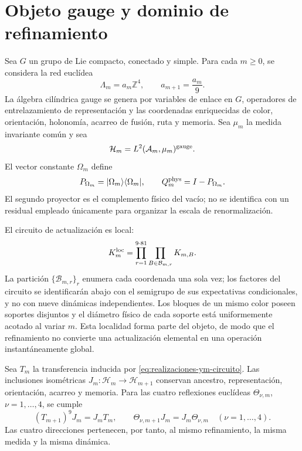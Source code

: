 \section*{Objeto gauge y dominio de refinamiento}

Sea \(G\) un grupo de Lie compacto, conectado y simple. Para cada
\(m\geq0\), se considera la red euclídea
\begin{equation}\label{eq:realizaciones-ym-red}
 \Lambda_m=a_m\mathbb Z^4,
 \qquad a_{m+1}=\frac{a_m}{9}.
\end{equation}
La álgebra cilíndrica gauge se genera por variables de enlace en \(G\),
operadores de entrelazamiento de representación y las coordenadas
enriquecidas de color,
orientación, holonomía, acarreo de fusión, ruta y memoria. Sea \(\mu_m\) la
medida invariante común y sea
\[
 \mathcal H_m=L^2(\mathcal A_m,\mu_m)^{\rm gauge}.
\]
El vector constante \(\Omega_m\) define
\begin{equation}\label{eq:realizaciones-ym-proyectores}
 P_{\Omega_m}=|\Omega_m\rangle\langle\Omega_m|,
 \qquad Q_m^{\rm phys}=I-P_{\Omega_m}.
\end{equation}
El segundo proyector es el complemento físico del vacío; no se identifica
con un residual empleado únicamente para organizar la escala de
renormalización.

El circuito de actualización es local:
\begin{equation}\label{eq:realizaciones-ym-circuito}
 K_m^{\rm loc}
 =\prod_{r=1}^{9\cdot81}
   \prod_{B\in\mathcal B_{m,r}}K_{m,B}.
\end{equation}
La partición \(\{\mathcal B_{m,r}\}_r\) enumera cada coordenada una sola vez; los factores
del circuito se identificarán abajo con el semigrupo de sus expectativas
condicionales, y no con nueve dinámicas independientes.
Los bloques de un mismo color poseen soportes disjuntos y el diámetro físico
de cada soporte está uniformemente acotado al variar \(m\). Esta localidad
forma parte del objeto, de modo que el refinamiento no convierte una
actualización elemental en una operación instantáneamente global.

Sea \(T_m\) la transferencia inducida por
\eqref{eq:realizaciones-ym-circuito}. Las inclusiones isométricas
\(J_m:\mathcal H_m\to\mathcal H_{m+1}\) conservan ancestro,
representación, orientación, acarreo y memoria. Para las cuatro reflexiones
euclídeas \(\Theta_{\nu,m}\), \(\nu=1,\ldots,4\), se cumple
\begin{equation}\label{eq:realizaciones-ym-entrelazamiento}
 (T_{m+1})^9J_m=J_mT_m,
 \qquad
 \Theta_{\nu,m+1}J_m=J_m\Theta_{\nu,m}
 \quad(\nu=1,\ldots,4).
\end{equation}
Las cuatro direcciones pertenecen, por tanto, al mismo refinamiento, la misma
medida y la misma dinámica.

